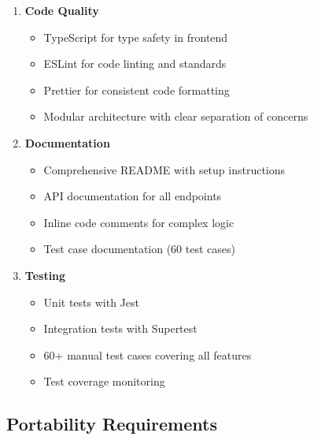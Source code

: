 \documentclass[12pt,a4paper]{report}
\begin{document}
\begin{enumerate}[leftmargin=*]
    \item \textbf{Code Quality}
    \begin{itemize}
        \item TypeScript for type safety in frontend
        \item ESLint for code linting and standards
        \item Prettier for consistent code formatting
        \item Modular architecture with clear separation of concerns
    \end{itemize}
    
    \item \textbf{Documentation}
    \begin{itemize}
        \item Comprehensive README with setup instructions
        \item API documentation for all endpoints
        \item Inline code comments for complex logic
        \item Test case documentation (60 test cases)
    \end{itemize}
    
    \item \textbf{Testing}
    \begin{itemize}
        \item Unit tests with Jest
        \item Integration tests with Supertest
        \item 60+ manual test cases covering all features
        \item Test coverage monitoring
    \end{itemize}
\end{enumerate}

\subsection{Portability Requirements}
\end{document}
